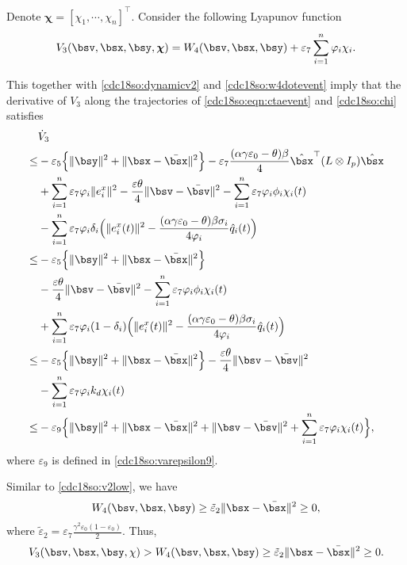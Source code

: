 \documentclass[letterpaper, 10 pt, conference]{ieeeconf}  %
\begin{document}
Denote ${\boldsymbol{\chi}}=[\chi_1,\cdots,\chi_n]^\top$.
Consider the following Lyapunov function
\begin{align*}
V_3(\bsv,\bsx,\bsy,{\boldsymbol{\chi}})=W_4(\bsv,\bsx,\bsy)+\varepsilon_7\sum_{i=1}^n\varphi_i\chi_i.
\end{align*}

This together with \eqref{cdc18so:dynamicv2} and \eqref{cdc18so:w4dotevent} imply that the derivative of $V_3$ along the trajectories of \eqref{cdc18so:eqn:ctaevent} and \eqref{cdc18so:chi} satisfies
\begin{align}\label{cdc18so:v3dot}
&\dot{V}_3\nonumber\\
\le&-\varepsilon_5\Big\{\|\bsy\|^2+\|\bsx-\bar{\bsx}\|^2\Big\}
-\varepsilon_7\frac{(\alpha\gamma\varepsilon_0-\theta)\beta}{4}\hat{\bsx}^\top (L \otimes I_p)\hat{\bsx}\nonumber\\
&+\sum_{i=1}^{n}\varepsilon_7\varphi_i\|e^{x}_i\|^2
-\frac{\varepsilon\theta}{4}\|\bsv-\bar{\bsv}\|^2-\sum_{i=1}^n\varepsilon_7\varphi_i\phi_i \chi_i(t)\nonumber\\
&-\sum_{i=1}^n\varepsilon_7\varphi_i\delta_i \Big(\|e^{x}_i(t)\|^2 -\frac{(\alpha\gamma\varepsilon_0-\theta)\beta\sigma_i}{4\varphi_i}\hat{q}_i(t)\Big)\nonumber\\
\le&-\varepsilon_5\Big\{\|\bsy\|^2+\|\bsx-\bar{\bsx}\|^2\Big\}\nonumber\\
&-\frac{\varepsilon\theta }{4}\|\bsv-\bar{\bsv}\|^2
-\sum_{i=1}^n\varepsilon_7\varphi_i\phi_i \chi_i(t)\nonumber\\
&+\sum_{i=1}^n\varepsilon_7\varphi_i(1-\delta_i) \Big(\|e^{x}_i(t)\|^2 -\frac{(\alpha\gamma\varepsilon_0-\theta)\beta\sigma_i}{4\varphi_i}\hat{q}_i(t)\Big)\nonumber\\
\le&-\varepsilon_5\Big\{\|\bsy\|^2+\|\bsx-\bar{\bsx}\|^2\Big\}-\frac{\varepsilon\theta }{4}\|\bsv-\bar{\bsv}\|^2\nonumber\\
&
-\sum_{i=1}^n\varepsilon_7\varphi_ik_d\chi_i(t)\nonumber\\
\le&-\varepsilon_9\Big\{\|\bsy\|^2+\|\bsx-\bar{\bsx}\|^2+\|\bsv-\bar{\bsv}\|^2
+\sum_{i=1}^n\varepsilon_7\varphi_i\chi_i(t)\Big\},
\end{align}
where $\varepsilon_9$ is defined in \eqref{cdc18so:varepsilon9}.



Similar to \eqref{cdc18so:v2low}, we have
\begin{align*}%
W_4(\bsv,\bsx,\bsy)\ge \tilde{\varepsilon}_2\|\bsx-\bar{\bsx}\|^2\ge0,
\end{align*}
where $\tilde{\varepsilon}_2=\varepsilon_7
\frac{\gamma^2\varepsilon_0(1-\varepsilon_0)}{2}$.
Thus,
\begin{align}\label{cdc18so:v3low}
V_3(\bsv,\bsx,\bsy,\chi)>W_4(\bsv,\bsx,\bsy)\ge \tilde{\varepsilon}_2\|\bsx-\bar{\bsx}\|^2\ge0.
\end{align}
\end{document}
